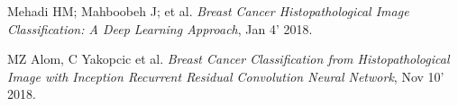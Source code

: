 \documentclass[10 pt]{report}
\begin{document}
\begin{thebibliography}{1}
\bibitem{}\label{MM} Mehadi HM; Mahboobeh J; et al.  {\em Breast Cancer Histopathological Image Classification: A Deep Learning Approach}, Jan 4' 2018.

\bibitem{}\label{MZC} MZ Alom, C Yakopcic  et al.  {\em Breast Cancer Classification from Histopathological Image with Inception Recurrent Residual Convolution Neural Network},  Nov 10' 2018.



  \end{thebibliography}
\end{document}

